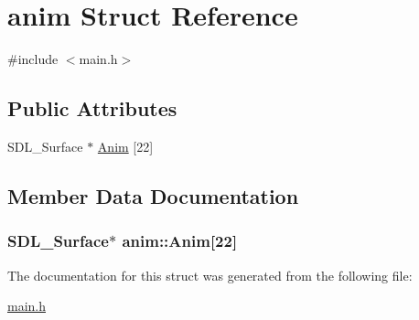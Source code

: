 \hypertarget{structanim}{}\section{anim Struct Reference}
\label{structanim}


{\ttfamily \#include $<$main.\+h$>$}

\subsection*{Public Attributes}
\begin{DoxyCompactItemize}
\item 
S\+D\+L\+\_\+\+Surface $\ast$ \hyperlink{structanim_a23dbd46b836e4a3cea6d8abb423963f4}{Anim} \mbox{[}22\mbox{]}
\end{DoxyCompactItemize}


\subsection{Member Data Documentation}
\subsubsection[{\texorpdfstring{Anim}{Anim}}]{\setlength{\rightskip}{0pt plus 5cm}S\+D\+L\+\_\+\+Surface$\ast$ anim\+::\+Anim\mbox{[}22\mbox{]}}\hypertarget{structanim_a23dbd46b836e4a3cea6d8abb423963f4}{}\label{structanim_a23dbd46b836e4a3cea6d8abb423963f4}


The documentation for this struct was generated from the following file\+:\begin{DoxyCompactItemize}
\item 
\hyperlink{main_8h}{main.\+h}\end{DoxyCompactItemize}
